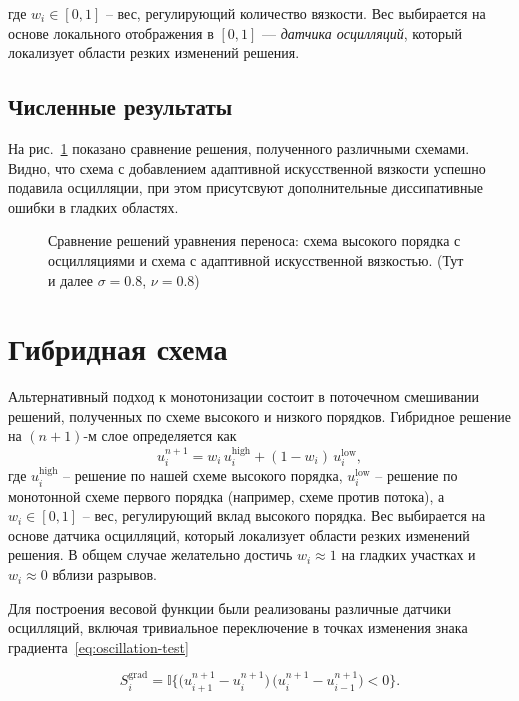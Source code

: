 \documentclass[14pt]{report}
\begin{document}
где $w_i \in [0,1]$ -- вес, регулирующий количество вязкости. Вес выбирается на основе локального отображения в $[0, 1]$ --- \emph{датчика осцилляций}, который локализует области резких изменений решения.

\subsection{Численные результаты}
На рис.~\ref{fig:adaptive-artificial-viscosity} показано сравнение решения, полученного различными схемами. Видно, что схема с добавлением адаптивной искусственной вязкости успешно подавила осцилляции, при этом присутсвуют дополнительные диссипативные ошибки в гладких областях.

\begin{figure}[ht]
\centering

\caption{Сравнение решений уравнения переноса: схема высокого порядка с осцилляциями и схема с адаптивной искусственной вязкостью. (Тут и далее $\sigma = 0.8$, $\nu = 0.8$)}
\label{fig:adaptive-artificial-viscosity}
\end{figure}

\section{Гибридная схема}
Альтернативный подход к монотонизации состоит в поточечном смешивании решений, полученных по схеме высокого и низкого порядков. Гибридное решение на $(n+1)$-м слое определяется как
\begin{equation}
u^{n+1}_i = w_i\, u^{\text{high}}_i + (1-w_i)\, u^{\text{low}}_i,
\label{eq:hybrid}
\end{equation}
где $u^{\text{high}}_i$ -- решение по нашей схеме высокого порядка, $u^{\text{low}}_i$ -- решение по монотонной схеме первого порядка (например, схеме против потока), а $w_i \in [0,1]$ -- вес, регулирующий вклад высокого порядка. Вес выбирается на основе датчика осцилляций, который локализует области резких изменений решения. В общем случае желательно достичь $w_i \approx 1$ на гладких участках и $w_i \approx 0$ вблизи разрывов.

Для построения весовой функции были реализованы различные датчики осцилляций, включая тривиальное переключение в точках изменения знака градиента~\eqref{eq:oscillation-test} 

\[
    S^{\text{grad}}_i = \mathbb{I}\{\bigl(u_{i+1}^{n+1} - u_i^{n+1}\bigr) \,
    \bigl(u_i^{n+1} - u_{i-1}^{n+1}\bigr) < 0\}.
\]
\end{document}
